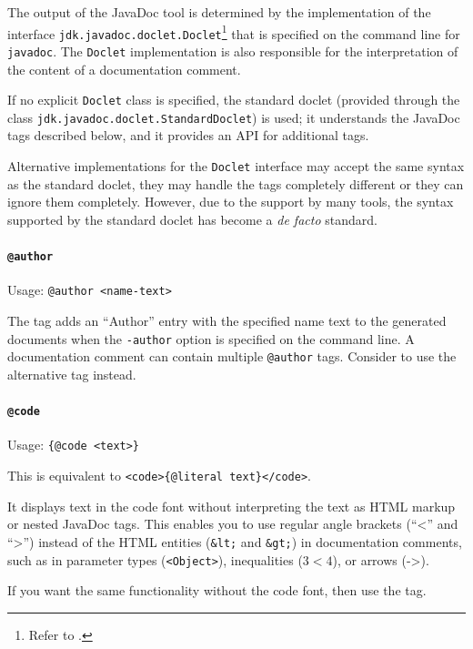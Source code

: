 \documentclass[11pt,a4paper, titlepage, parskip=half, headsepline, footsepline, cleardoublepage=current, headheight=1cm]{scrbook}
\begin{document}
The output of the JavaDoc tool is determined by the implementation of the interface \lstinline|jdk.javadoc.doclet.Doclet|\footnote{Refer to \autocite{ORACLE_DOC_DOCLET_INTERFACE}.} that is specified on the command line for \verb#javadoc#. The \lstinline|Doclet| implementation is also responsible for the interpretation of the content of a documentation comment.

If no explicit \lstinline|Doclet| class is specified, the standard doclet (provided through the class \lstinline|jdk.javadoc.doclet.StandardDoclet|\autocite{ORACLE_DOC_STANDARDDOCLET_CLASS}) is used; it understands the JavaDoc tags described below, and it provides an API for additional tags.

Alternative implementations for the \lstinline|Doclet| interface may accept the same syntax as the standard doclet, they may handle the tags completely different or they can ignore them completely. However, due to the support by many tools, the syntax supported by the standard doclet has become a \textit{de facto} standard.

\paragraph{\lstinline|@author|}\label{sec:TagAuthor} Usage: \lstinline|@author <name-text>|

The tag adds an “Author” entry with the specified name text to the generated documents when the \verb#-author# option is specified on the command line. A documentation comment can contain multiple \lstinline|@author| tags. Consider to use the alternative  tag instead.

\paragraph{\lstinline|@code|}\label{sec:TagCode}  Usage: \lstinline|{@code <text>}|

This is equivalent to \lstinline|<code>{@literal text}</code>|.

It displays text in the code font without interpreting the text as HTML markup or nested JavaDoc tags. This enables you to use regular angle brackets (“\textless” and “\textgreater”) instead of the HTML entities (\verb#&lt;# and \verb#&gt;#) in documentation comments, such as in parameter types (\verb#<Object>#), inequalities ($3 < 4$), or arrows (-\textgreater).

If you want the same functionality without the code font, then use the  tag. 
\end{document}
